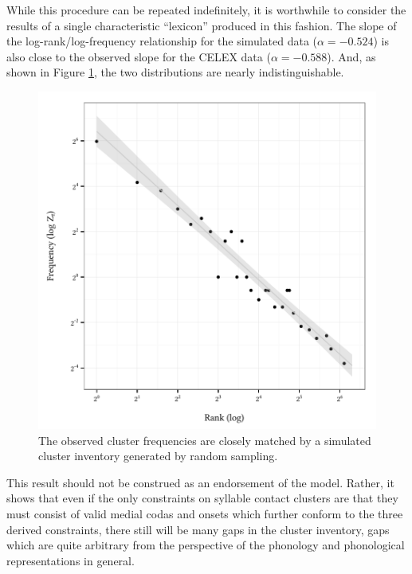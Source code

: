 While this procedure can be repeated indefinitely, it is worthwhile to consider the results of a single characteristic ``lexicon'' produced in this fashion. The slope of the log-rank/log-frequency relationship for the simulated data ($\alpha = -0.524$) is also close to the observed slope for the CELEX data ($\alpha = -0.588$). And, as shown in Figure \ref{sim}, the two distributions are nearly indistinguishable.

\begin{figure}
\centering
\includegraphics{sim.pdf}
\caption{The observed cluster frequencies are closely matched by a simulated cluster inventory generated by random sampling.}
\label{sim}
\end{figure}

This result should not be construed as an endorsement of the \citet{Pierrehumbert1994} model. Rather, it shows that even if the only constraints on syllable contact clusters are that they must consist of valid medial codas and onsets which further conform to the three derived constraints, there still will be many gaps in the cluster inventory, gaps which are quite arbitrary from the perspective of the phonology and phonological representations in general.

